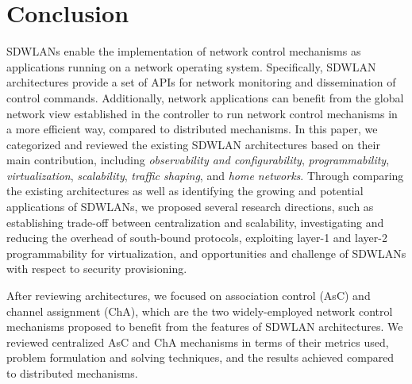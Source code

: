 

\section{Conclusion}
\label{Conclusion}
SDWLANs enable the implementation of network control mechanisms as applications running on a network operating system.
Specifically, SDWLAN architectures provide a set of APIs for network monitoring and dissemination of control commands.
Additionally, network applications can benefit from the global network view established in the controller to run network control mechanisms in a more efficient way, compared to distributed mechanisms.
In this paper, we categorized and reviewed the existing SDWLAN architectures based on their main contribution, including \textit{observability and configurability}, \textit{programmability}, \textit{virtualization}, \textit{scalability}, \textit{traffic shaping}, and \textit{home networks}. 
Through comparing the existing architectures as well as identifying the growing and potential applications of SDWLANs, we proposed several research directions, such as establishing trade-off between centralization and scalability, investigating and reducing the overhead of south-bound protocols, exploiting layer-1 and layer-2 programmability for virtualization, and opportunities and challenge of SDWLANs with respect to security provisioning.


After reviewing architectures, we focused on association control (AsC) and channel assignment (ChA), which are the two widely-employed network control mechanisms proposed to benefit from the features of SDWLAN architectures.
We reviewed centralized AsC and ChA mechanisms in terms of their metrics used, problem formulation and solving techniques, and the results achieved compared to distributed mechanisms.

